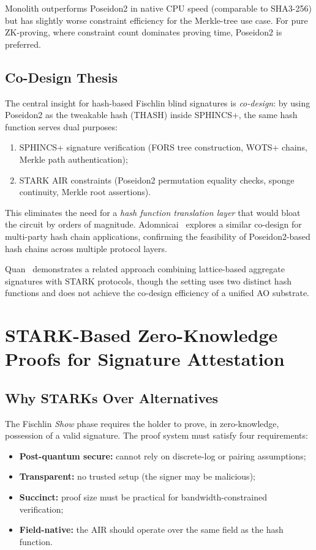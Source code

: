 \documentclass[11pt,a4paper]{article}
\begin{document}
Monolith \cite{Grassi2024Monolith} outperforms Poseidon2 in native CPU speed (comparable to
SHA3-256) but has slightly worse constraint efficiency for the Merkle-tree use case.
For pure ZK-proving, where constraint count dominates proving time, Poseidon2 is preferred.

\subsection{Co-Design Thesis}

The central insight for hash-based Fischlin blind signatures is \emph{co-design}: by using
Poseidon2 as the tweakable hash (THASH) inside SPHINCS+, the same hash function serves dual
purposes:
\begin{enumerate}
  \item SPHINCS+ signature verification (FORS tree construction, WOTS+ chains, Merkle path
        authentication);
  \item STARK AIR constraints (Poseidon2 permutation equality checks, sponge continuity,
        Merkle root assertions).
\end{enumerate}
This eliminates the need for a \emph{hash function translation layer} that would bloat the
circuit by orders of magnitude.  Adomnicai~\cite{Adomnicai2026} explores a similar co-design
for multi-party hash chain applications, confirming the feasibility of Poseidon2-based hash
chains across multiple protocol layers.

Quan~\cite{Quan2022} demonstrates a related approach combining lattice-based aggregate
signatures with STARK protocols, though the setting uses two distinct hash functions and does
not achieve the co-design efficiency of a unified AO substrate.

\section{STARK-Based Zero-Knowledge Proofs for Signature Attestation}
\label{sec:stark}

\subsection{Why STARKs Over Alternatives}

The Fischlin \emph{Show} phase requires the holder to prove, in zero-knowledge, possession of a
valid signature.  The proof system must satisfy four requirements:
\begin{itemize}
  \item \textbf{Post-quantum secure:} cannot rely on discrete-log or pairing assumptions;
  \item \textbf{Transparent:} no trusted setup (the signer may be malicious);
  \item \textbf{Succinct:} proof size must be practical for bandwidth-constrained verification;
  \item \textbf{Field-native:} the AIR should operate over the same field as the hash function.
\end{itemize}
\end{document}
